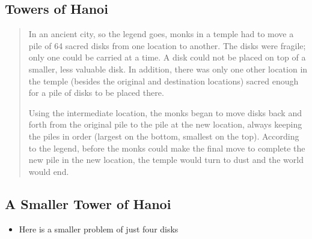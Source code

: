 
\begin{slide}
\section[-2]{Towers of Hanoi}

\begin{PauseHighLight}
\begin{quote}
In an ancient city, so the legend goes, monks in a temple had to move a
pile of 64 sacred disks from one location to another. The disks were
fragile; only one could be carried at a time. A disk could not be placed
on top of a smaller, less valuable disk. In addition, there was only one
other location in the temple (besides the original and destination
locations) sacred enough for a pile of disks to be placed there.\pause

Using the intermediate location, the monks began to move disks back and
forth from the original pile to the pile at the new location, always
keeping the piles in order (largest on the bottom, smallest on the
top). According to the legend, before the monks could make the final
move to complete the new pile in the new location, the temple would turn
to dust and the world would end. \pause
\end{quote}
\end{PauseHighLight}

\end{slide}


\begin{slide}
\section{A Smaller Tower of Hanoi}
\pb
\pausebuild
\begin{itemize}
\item Here is a smaller problem of just four disks\pauseh
\end{itemize}
\begin{center}
  \pause
\end{center}
\end{slide}



